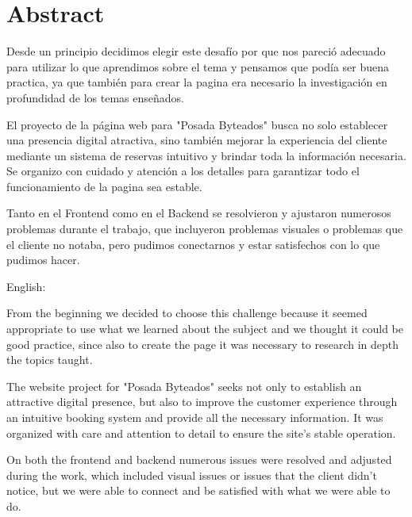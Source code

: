 \section{Abstract}


Desde un principio decidimos elegir este desafío por que nos pareció adecuado para utilizar lo que aprendimos sobre el tema y pensamos que podía ser buena practica, ya que también para crear la pagina era necesario la investigación en profundidad de los temas enseñados.


El proyecto de la página web para "Posada Byteados" busca no solo establecer una presencia digital atractiva, sino también mejorar la experiencia del cliente mediante un sistema de reservas intuitivo y brindar toda la información necesaria. Se organizo con cuidado y atención a los detalles para garantizar todo el funcionamiento de la pagina sea estable.


Tanto en el Frontend como en el Backend se resolvieron y ajustaron numerosos problemas durante el trabajo, que incluyeron problemas visuales o problemas que el cliente no notaba, pero pudimos conectarnos y estar satisfechos con lo que pudimos hacer.

\hspace{5cm}

English:


From the beginning we decided to choose this challenge because it seemed appropriate to use what we learned about the subject and we thought it could be good practice, since also to create the page it was necessary to research in depth the topics taught.

The website project for "Posada Byteados" seeks not only to establish an attractive digital presence, but also to improve the customer experience through an intuitive booking system and provide all the necessary information. It was organized with care and attention to detail to ensure the site's stable operation.

On both the frontend and backend numerous issues were resolved and adjusted during the work, which included visual issues or issues that the client didn't notice, but we were able to connect and be satisfied with what we were able to do.
